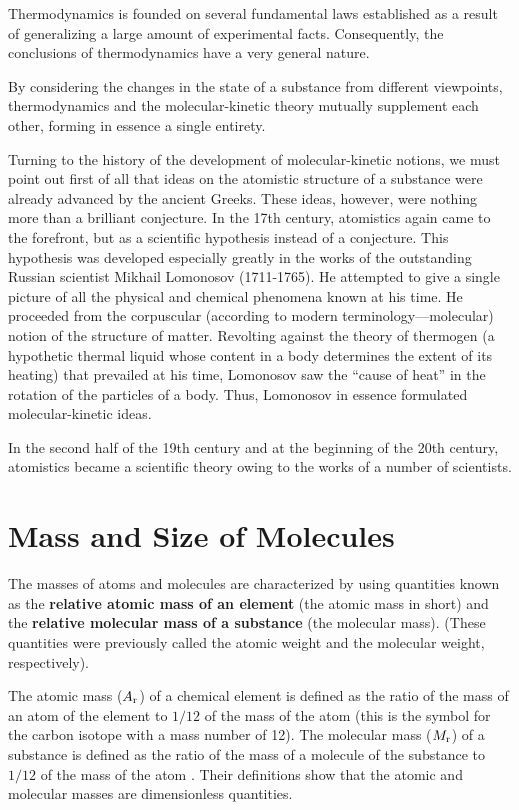 Thermodynamics is founded on several fundamental laws established as a result of generalizing a large amount of experimental facts. Consequently, the conclusions of thermodynamics have a very general nature.

By considering the changes in the state of a substance from different viewpoints, thermodynamics and the molecular-kinetic theory mutually supplement each other, forming in essence a single entirety.

Turning to the history of the development of molecular-kinetic notions, we must point out first of all that ideas on the atomistic structure of a substance were already advanced by the ancient Greeks. These ideas, however, were nothing more than a brilliant conjecture. In the 17th century, atomistics again came to the forefront, but as a scientific hypothesis instead of a conjecture. This hypothesis was developed especially greatly in the works of the outstanding Russian scientist Mikhail Lomonosov (1711-1765). He attempted to give a single picture of all the physical and chemical phenomena known at his time. He proceeded from the corpuscular (according to modern terminology---molecular) notion of the structure of matter. Revolting against the theory of thermogen (a hypothetic thermal liquid whose content in a body determines the extent of its heating) that prevailed at his time, Lomonosov saw the ``cause of heat'' in the rotation of the particles of a body. Thus, Lomonosov in essence formulated molecular-kinetic ideas.

In the second half of the 19th century and at the beginning of the 20th century, atomistics became a scientific theory owing to the works of a number of scientists.

\section{Mass and Size of Molecules}\label{sec:10_2}

The masses of atoms and molecules are characterized by using quantities known as the \textbf{relative atomic mass of an element} (the atomic mass in short) and the \textbf{relative molecular mass of a substance} (the molecular mass). (These quantities were previously called the atomic weight and the molecular weight, respectively).

The atomic mass ($A_{\text{r}}$) of a chemical element is defined as the ratio of the mass of an atom of the element to $1/12$ of the mass of the atom  (this is the symbol for the carbon isotope with a mass number of \num{12}). The molecular mass ($M_{\text{r}}$) of a substance is defined as the ratio of the mass of a molecule of the substance to $1/12$ of the mass of the atom . Their definitions show that the atomic and molecular masses are dimensionless quantities.

